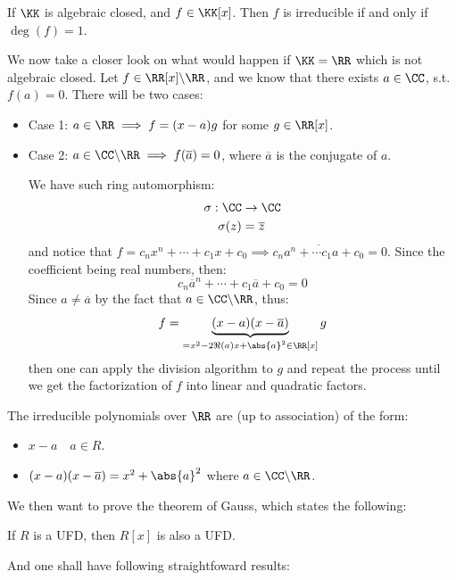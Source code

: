 \begin{corollary}
	If \( \KK \) is algebraic closed, and \( f\in \KK[x] \). Then \( f \) is irreducible if and only
	if \( \deg(f) = 1 \).
\end{corollary}
We now take a closer look on what would happen if \( \KK= \RR\) which is not algebraic closed. Let
\( f \in \RR[x] \backslash \RR \), and we know that there exists \( a\in \CC \), s.t. \( f(a) = 0
\). There will be two cases:
\begin{itemize}
	\item Case 1: \( a\in \RR \implies f = (x-a)g\) for some \( g\in \RR[x] \).
	\item Case 2: \( a\in \CC\backslash \RR \implies f(\overline{a}) = 0\), where \( \overline{a} \)
	      is the conjugate of \( a \).
	      \begin{note}
		      We have such ring automorphism:
		      \[
			      \begin{aligned}
				      \sigma : \CC & \to \CC        \\
				      \sigma(z)    & = \overline{z}
			      \end{aligned}
		      \]
		      and notice that \( f = c_n x^n + \cdots + c_1 x +c_0 \implies \overline{c_na^n + \cdots
			      c_1 a + c_0} = 0 \). Since the coefficient being real numbers, then:
		      \[
			      c_n \overline{a}^n + \cdots + c_1 \overline{a} + c_0 = 0
		      \]
		      Since \( a\ne \overline{a} \) by the fact that \( a\in \CC\backslash \RR \), thus:
		      \[
			      f = \underbrace{(x-a)(x-\overline{a})}_{=x^2-2\Re(a)x + \abs{a}^2 \in \RR[x]}  g
		      \]
		      then one can apply the division algorithm to \( g \) and repeat the process until we get
		      the factorization of \( f \) into linear and quadratic factors.
	      \end{note}
\end{itemize}

\begin{conclusion}
	The irreducible polynomials over \( \RR \) are (up to association) of the form:
	\begin{itemize}
		\item \( x-a \quad a\in R\).
		\item \( (x-a)(x-\overline{a}) = x^2 + \abs{a}^2 \) where \( a\in \CC\backslash \RR \).
	\end{itemize}
\end{conclusion}

We then want to prove the theorem of Gauss, which states the following:
\begin{theorem}
	\label{thm:guass}
	If \( R \) is a UFD, then \( R[x] \) is also a UFD.
\end{theorem}
And one shall have following straightfoward results:

